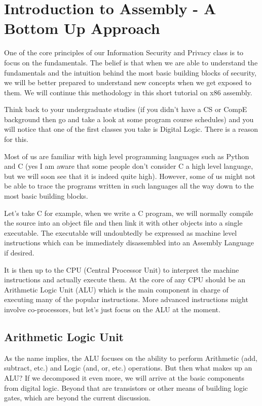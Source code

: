 \chapter{Introduction to Assembly - A Bottom Up Approach}

One of the core principles of our Information Security and Privacy class is to focus on the fundamentals. The belief is that when we are able to understand the fundamentals and the intuition behind the most basic building blocks of security, we will be better prepared to understand new concepts when we get exposed to them. We will continue this methodology in this short tutorial on x86 assembly. 

Think back to your undergraduate studies (if you didn’t have a CS or CompE background then go and take a look at some program course schedules) and you will notice that one of the first classes you take is Digital Logic. There is a reason for this. 

Most of us are familiar with high level programming languages such as Python and C (yes I am aware that some people don’t consider C a high level language, but we will soon see that it is indeed quite high). However, some of us might not be able to trace the programs written in such languages all the way down to the most basic building blocks. 

Let’s take C for example, when we write a C program, we will normally compile the source into an object file and then link it with other objects into a single executable. The executable will undoubtedly be expressed as machine level instructions which can be immediately disassembled into an Assembly Language if desired. 

It is then up to the CPU (Central Processor Unit) to interpret the machine instructions and actually execute them. At the core of any CPU should be an Arithmetic Logic Unit (ALU) which is the main component in charge of executing many of the popular instructions. More advanced instructions might involve co-processors, but let’s just focus on the ALU at the moment.

\section{Arithmetic Logic Unit}

As the name implies, the ALU focuses on the ability to perform Arithmetic (add, subtract, etc.) and Logic (and, or, etc.) operations. But then what makes up an ALU? If we decomposed it even more, we will arrive at the basic components from digital logic. Beyond that are transistors or other means of building logic gates, which are beyond the current discussion.

